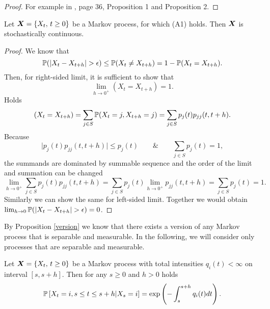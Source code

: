 {	\begin{proof}
		For example in \cite{Mandl85}, page 36, Proposition 1 and Proposition 2.
	\end{proof}

\begin{proposition} %
	Let $\bm{X} = \{ X_t ,\, t \geq 0 \}$ be a Markov process, for which (A1) holds. Then $\bm{X}$ is stochastically continuous.
\end{proposition}

\begin{proof}
	We know that
	\[
		\operatorname{\mathbb{P}} ( \vert X_t - X_{t+h} \vert > \epsilon ) \leq \operatorname{\mathbb{P}} (X_t \neq X_{t+h}) = 1 - \operatorname{\mathbb{P}} (X_t = X_{t+h}).
	\]
	Then, for right-sided limit, it is sufficient to show that
	\[
		\lim_{h \to 0^{+}} (X_t = X_{t+h}) = 1.
	\]
	Holds
	\[
		(X_t = X_{t+h}) = \sum_{j \in S} \operatorname{\mathbb{P}} (X_t = j, X_{t+h} = j) = \sum_{j \in S} p_j (t) p_{jj} (t, t+h).
	\]
	Because
	\[
		\vert p_j (t) p_{jj} (t, t+h) \vert \leq p_j (t)
		\qquad \& \qquad
		\sum_{j \in S} p_j (t) = 1,
	\]
	the summands are dominated by summable sequence and the order of the limit and summation can be changed
	\[
		\lim_{h \to 0^{+}} \sum_{j \in S} p_j (t) p_{jj} (t, t+h) = \sum_{j \in S} p_j (t) \lim_{h \to 0^{+}} p_{jj} (t, t+h) = \sum_{j \in S} p_j (t) = 1.
	\]
	Similarly we can show the same for left-sided limit. Together we would obtain $\lim_{h \to 0} \operatorname{\mathbb{P}} ( \vert X_t - X_{t+h} \vert > \epsilon ) = 0$.
\end{proof}

By Proposition \ref{version} we know that there exists a version of any Markov process that is separable and measurable. In the following, we will consider only processes that are separable and measurable.

\begin{proposition} %
	Let $\bm{X} = \{ X_t ,\, t \geq 0 \}$ be a Markov process with total intensities $q_i (t) < \infty$ on interval $[s, s+h]$. Then for any $s \geq 0$ and $h > 0$ holds
	\[
		\operatorname{\mathbb{P}} \left[ X_t = i, s \leq t \leq s+h \vert X_s = i \right]
		= \exp \left(- \int_{s}^{s+h} q_i(t) dt \right).
	\] 
\end{proposition}

}
